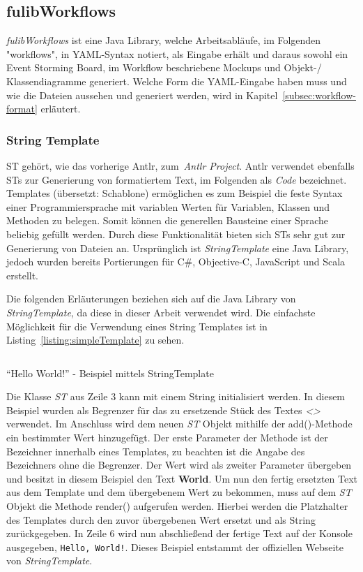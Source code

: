 \subsection{fulibWorkflows}\label{subsec:fulibworkflows}
\textit{fulibWorkflows} ist eine Java Library, welche Arbeitsabläufe, im Folgenden "workflows", in \ac{YAML}-Syntax notiert, als Eingabe erhält und daraus
sowohl ein Event Storming Board, im Workflow beschriebene Mockups und Objekt-/ Klassendiagramme generiert.
Welche Form die YAML-Eingabe haben muss und wie die Dateien aussehen und generiert werden, wird in Kapitel~\ref{subsec:workflow-format} erläutert.



\subsubsection{String Template}
\ac{ST} gehört, wie das vorherige \ac{Antlr}, zum~\textit{Antlr Project}.
\ac{Antlr} verwendet ebenfalls \ac{ST}s zur Generierung von formatiertem Text, im Folgenden als \textit{Code} bezeichnet.
Templates (übersetzt: Schablone) ermöglichen es zum Beispiel die feste Syntax einer Programmiersprache mit variablen Werten für
Variablen, Klassen und Methoden zu belegen.
Somit können die generellen Bausteine einer Sprache beliebig gefüllt werden.
Durch diese Funktionalität bieten sich \ac{ST}s sehr gut zur Generierung von Dateien an.
Ursprünglich ist \textit{StringTemplate} eine Java Library, jedoch wurden bereits Portierungen für C\#, Objective-C, JavaScript und Scala erstellt.

Die folgenden Erläuterungen beziehen sich auf die Java Library von \textit{StringTemplate}, da diese in dieser Arbeit verwendet wird.
Die einfachste Möglichkeit für die Verwendung eines String Templates ist in Listing~\ref{listing:simpleTemplate} zu sehen.

\begin{listing}[!ht]
    \inputminted{java}{listings/2.2.1/JavaStringTemplateExample.java}
    \caption{``Hello World!'' - Beispiel mittels StringTemplate}
    \label{listing:simpleTemplate}
\end{listing}

Die Klasse \textit{ST} aus Zeile 3 kann mit einem String initialisiert werden.
In diesem Beispiel wurden als Begrenzer für das zu ersetzende Stück des Textes \textit{<>} verwendet.
Im Anschluss wird dem neuen \textit{ST} Objekt mithilfe der add()-Methode ein bestimmter Wert hinzugefügt.
Der erste Parameter der Methode ist der Bezeichner innerhalb eines Templates, zu beachten ist die Angabe des Bezeichners ohne die Begrenzer.
Der Wert wird als zweiter Parameter übergeben und besitzt in diesem Beispiel den Text \textbf{World}.
Um nun den fertig ersetzten Text aus dem Template und dem übergebenem Wert zu bekommen, muss auf dem \textit{ST} Objekt die Methode render() aufgerufen werden.
Hierbei werden die Platzhalter des Templates durch den zuvor übergebenen Wert ersetzt und als String zurückgegeben.
In Zeile 6 wird nun abschließend der fertige Text auf der Konsole ausgegeben, \texttt{Hello, World!}.
Dieses Beispiel entstammt der offiziellen Webseite von \textit{StringTemplate}.\cite*{stOrg}

